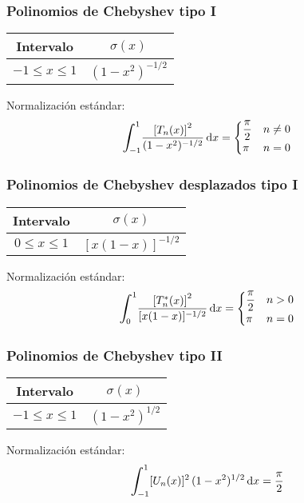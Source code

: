 \documentclass[12pt]{beamer}
\begin{document}
\begin{frame}
\frametitle{Polinomios de Chebyshev tipo I}
\begin{table}
\begin{tabular}{c c}
Intervalo & $\sigma (x)$ \\ \hline
$-1 \leq x \leq 1$ & $(1 - x^{2})^{-1/2}$ \\ \hline 
\end{tabular}
\end{table}
Normalización estándar:
\begin{align*}
\scaleint{6ex}_{\bs -1}^{1} \dfrac{\left[ T_{n}(x) \right]^{2}}{(1 - x^{2})^{-1/2}} \dd{x} = \begin{cases} 
\displaystyle \frac{\pi}{2} & n \neq 0 \\
\pi & n = 0 \end{cases}
\end{align*}
\end{frame}
\begin{frame}
\frametitle{Polinomios de Chebyshev desplazados tipo I}
\begin{table}
\begin{tabular}{c c}
Intervalo & $\sigma (x)$ \\ \hline
$0 \leq x \leq 1$ & $[x (1 - x)]^{-1/2}$ \\ \hline 
\end{tabular}
\end{table}
Normalización estándar:
\begin{align*}
\scaleint{6ex}_{\bs 0}^{1} \dfrac{\left[ T_{n}^{*} (x) \right]^{2}}{[x (1 - x)]^{-1/2}} \dd{x} = \begin{cases} 
\displaystyle \frac{\pi}{2} & n > 0 \\
\pi & n = 0 \end{cases}
\end{align*}
\end{frame}
\begin{frame}
\frametitle{Polinomios de Chebyshev tipo II}
\begin{table}
\begin{tabular}{c c}
Intervalo & $\sigma (x)$ \\ \hline
$-1 \leq x \leq 1$ & $(1 - x^{2})^{1/2}$ \\ \hline
\end{tabular}
\end{table}
Normalización estándar:
\begin{align*}
\scaleint{6ex}_{\bs -1}^{1} [U_{n} (x)]^{2} \, (1 - x^{2})^{1/2} \, \dd x = \frac{\pi}{2}
\end{align*}
\end{frame}
\end{document}
